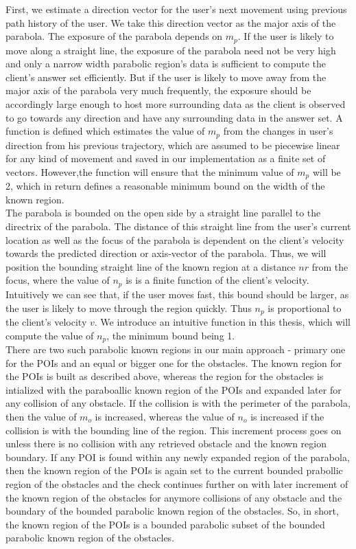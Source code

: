 First, we estimate a direction vector for the user's next movement using previous path history of the user. We take this direction vector as the major axis of the parabola. The exposure of the parabola depends on $m_p$. If the user is likely to move along a straight line, the exposure of the parabola need not be very high and only a narrow width parabolic region's data is sufficient to compute the client's answer set efficiently. But if the user is likely to move away from the major axis of the parabola very much frequently, the exposure should be accordingly large enough to host more surrounding data as the client is observed to go towards any direction and have any surrounding data in the answer set. A function is defined which estimates the value of $m_p$ from the changes in user's direction from his previous trajectory, which are assumed to be piecewise linear for any kind of movement and saved in our implementation as a finite set of vectors. However,the function will ensure that the minimum value of $m_p$ will be 2, which in return defines a reasonable minimum bound on the width of the known region.\\

The parabola is bounded on the open side by a straight line parallel to the directrix of the parabola. The distance of this straight line from the user's current location as well as the focus of the parabola is dependent on the client's velocity towards the predicted direction or axis-vector of the parabola. Thus, we will position the bounding straight line of the known region at a distance $ nr $ from the focus, where the value of $n_p$ is is a finite function of the client's velocity. Intuitively we can see that, if the user moves fast, this bound should be larger, as the user is likely to move through the region quickly. Thus $n_p$ is proportional to the client's velocity $v$. We introduce an intuitive function in this thesis, which will compute the value of $n_p$, the minimum bound being 1.\\

There are two such parabolic known regions in our main approach - primary one for the POIs and an equal or bigger one for the obstacles. The known region for the POIs is built as described above, whereas the region for the obstacles is intialized with the paraboallic known region of the POIs and expanded later for any collision of any obstacle. If the collision is with the perimeter of the parabola, then the value of $m_o$ is increased, whereas the value of $n_o$ is increased if the collision is with the bounding line of the region. This increment process goes on unless there is no collision with any retrieved obstacle and the known region boundary. If any POI is found within any newly expanded region of the parabola, then the known region of the POIs is again set to the current bounded prabollic region of the obstacles and the check continues further on with later increment of the known region of the obstacles for anymore collisions of any obstacle and the boundary of the bounded parabolic known region of the obstacles. So, in short, the known region of the POIs is a bounded parabolic subset of the bounded parabolic known region of the obstacles.\\

